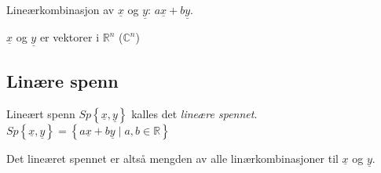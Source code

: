 \documentclass[11pt, a4paper, norsk]{article}
\begin{document}
        Lineærkombinasjon av $\underline{x}$ og $\underline{y}$: $a\underline{x} + b\underline{y}$.  
    
        $\underline{x}$ og $\underline{y}$ er vektorer i $\mathbb{R}^{n}$ ($\mathbb{C}^{n}$)
    \subsection{Linære spenn}%
    \label{sub:linaere_spenn}
    
        \begin{Definition}{Lineært spenn}{}
            $Sp\left\{\underline{x}, \underline{y}\right\}$ kalles det \textit{lineære spennet}.
            $Sp\left\{\underline{x}, \underline{y}\right\} = \left\{a\underline{x} + b\underline{y} \mid a, b \in \mathbb{R} \right\}$
            
            Det lineæret spennet er altså mengden av alle linærkombinasjoner til $\underline{x}$ og $\underline{y}$. 
        \end{Definition}
\end{document}
